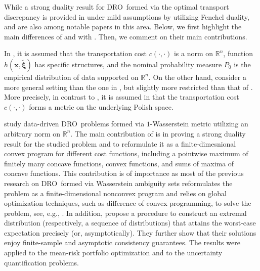 \documentclass[final,onefignum,onetabnum]{class}
\newcommand{\bs}[1]{\boldsymbol{#1}} %
\newcommand{\Bs}[1]{\mathbb{#1}} %
\newcommand{\Ts}[1]{\mathbbmtt{#1}} %
\newcommand{\txi}{\tilde{\bs{\xi}}}
\newcommand{\nomP}{\Ts{P}_{0}}
\newcommand{\dro}{DRO}
\begin{document}
While  a strong duality result for \dro\ formed via the optimal transport discrepancy is provided in \citet{blanchet2017DRO} under  mild assumptions by utilizing Fenchel duality, \citet{mohajerin2018} and \citet{gao2016} are also among  notable papers in this area. Below,  we first highlight the main differences of \citet{mohajerin2018} and \citet{gao2016} with \citet{blanchet2017DRO}. Then, we comment on their main contributions. 

In \citet{mohajerin2018},  it is assumed that the transportation cost $c(\cdot, \cdot)$ is a norm on $\Bs{R}^{n}$, function $h(\bs{x},\txi)$ has specific structures, and the nominal probability measure $P_{0}$ is the empirical distribution of data supported on $\Bs{R}^{n}$. 
On the other hand, \citet{gao2016} consider a more general setting than the one in \citet{mohajerin2018}, but slightly more  restricted than that of \citet{blanchet2016robust}. More precisely, in contrast to \citet{blanchet2016robust}, it is assumed in \citet{gao2016} that the transportation cost $c(\cdot, \cdot)$ forms a metric on the underlying Polish space. 

\citet{mohajerin2018} study data-driven \dro\ problems %
formed via $1$-Wasserstein metric utilizing an arbitrary  norm on $\Bs{R}^{n}$. The main contribution of  \citet{mohajerin2018} is in proving a strong duality result for the studied problem and to reformulate it as a finite-dimesnional convex program for different cost functions, including a pointwise maximum of finitely many concave functions, convex functions, and sums of maxima of concave functions. This contribution is of  importance as most of the previous research on \dro\ formed via Wasserstein ambiguity sets reformulates the problem as a finite-dimensional nonconvex program and 
relies on global optimization techniques, such as difference of convex programming,  to solve the problem, see, e.g., \cite[Theorem~6]{wozabal2012}.  In addition,  \citet{mohajerin2018}   propose a procedure to construct an extremal distribution (respectively, a sequence of distributions) that attains the worst-case expectation precisely (or, asymptotically). They further show that their solutions enjoy  finite-sample and asymptotic consistency guarantees. The results were applied to the mean-risk portfolio optimization and to the uncertainty quantification problems. 
\end{document}

